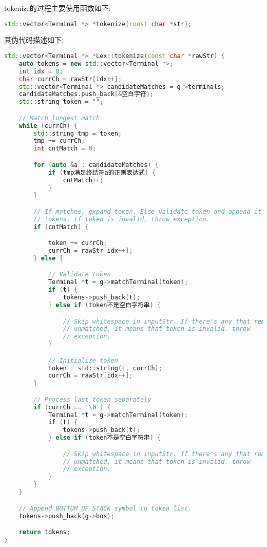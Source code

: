 tokenize的过程主要使用函数如下:
\begin{lstlisting}[language=c++]
std::vector<Terminal *> *tokenize(const char *str);
\end{lstlisting}
其伪代码描述如下:
\begin{lstlisting}[language=c++]
std::vector<Terminal *> *Lex::tokenize(const char *rawStr) {
    auto tokens = new std::vector<Terminal *>;
    int idx = 0;
    char currCh = rawStr[idx++];
    std::vector<Terminal *> candidateMatches = g->terminals;
    candidateMatches.push_back(&空白字符);
    std::string token = "";

    // Match longest match
    while (currCh) {
        std::string tmp = token;
        tmp += currCh;
        int cntMatch = 0;

        for (auto &a : candidateMatches) {
            if (tmp满足终结符a的正则表达式) {
                cntMatch++;
            }
        }

        // If matches, expand token. Else validate token and append it to
        // tokens. If token is invalid, throw exception.
        if (cntMatch) {

            token += currCh;
            currCh = rawStr[idx++];
        } else {

            // Validate token
            Terminal *t = g->matchTerminal(token);
            if (t) {
                tokens->push_back(t);
            } else if (token不是空白字符串) {

                // Skip whitespace in inputStr. If there's any that remains
                // unmatched, it means that token is invalid. throw
                // exception.
            }

            // Initialize token
            token = std::string(1, currCh);
            currCh = rawStr[idx++];
        }

        // Process last token separately
        if (currCh == '\0') {
            Terminal *t = g->matchTerminal(token);
            if (t) {
                tokens->push_back(t);
            } else if (token不是空白字符串) {

                // Skip whitespace in inputStr. If there's any that remains
                // unmatched, it means that token is invalid. throw
                // exception.
            }
        }
    }

    // Append BOTTOM OF STACK symbol to token list.
    tokens->push_back(g->bos);

    return tokens;
}
\end{lstlisting}

